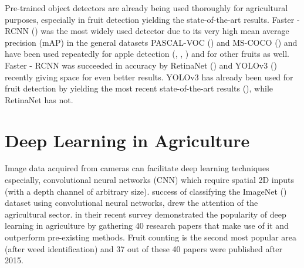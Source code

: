 Pre-trained object detectors are already being used thoroughly for agricultural purposes, especially in fruit detection yielding the state-of-the-art results. Faster - RCNN (\cite{ren2015faster}) was the most widely used detector due to its very high mean average precision (mAP) in the general datasets PASCAL-VOC (\cite{everingham2010pascal}) and MS-COCO (\cite{lin2014microsoft}) and have been used repeatedly for apple detection (\cite{sa2016deepfruits}, \cite{bargoti2017deep}, \cite{tao2018rapid}) and for other fruits as well. Faster - RCNN was succeeded in accuracy by RetinaNet (\cite{lin2017focal}) and YOLOv3 (\cite{redmon2018yolov3}) recently giving space for even better results. YOLOv3 has already been used for fruit detection by yielding the most recent state-of-the-art results (\cite{tian2019apple}), while RetinaNet has not. 


\section{Deep Learning in Agriculture}
Image data acquired from cameras can facilitate deep learning techniques especially, convolutional neural networks (CNN) which require spatial 2D inputs (with a depth channel of arbitrary size). \cite{krizhevsky2012imagenet} success of classifying the ImageNet (\cite{deng2009imagenet}) dataset using convolutional neural networks, drew the attention of the agricultural sector. \cite{kamilaris2018deep} in their recent survey demonstrated the popularity of deep learning in agriculture by gathering 40 research papers that make use of it and outperform pre-existing methods. Fruit counting is the second most popular area (after weed identification) and 37 out of these 40 papers were published after 2015. 

